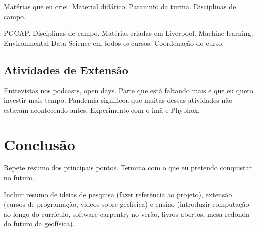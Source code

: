 \documentclass[10pt,a4paper,oneside]{book}
\begin{document}
Matérias que eu criei.
Material didático.
Paraninfo da turma.
Disciplinas de campo.

PGCAP.
Disciplinas de campo.
Matérias criadas em Liverpool.
Machine learning.
Environmental Data Science em todos os cursos.
Coordenação do curso.


\section{Atividades de Extensão}

Entrevistas nos podcasts, open days.
Parte que está faltando mais e que eu quero investir mais tempo.
Pandemia significou que muitas dessas atividades não estavam acontecendo antes.
Experimento com o imã e Phyphox.


\chapter{Conclusão}
\label{cap_conclusao}

Repete resumo dos principais pontos.
Termina com o que eu pretendo conquistar no futuro.

Incluir resumo de ideias de pesquisa (fazer referência ao projeto),
extensão (cursos de programação, videos sobre geofísica) e ensino (introduzir
computação ao longo do currículo, software carpentry no verão, livros abertos,
mesa redonda do futuro da geofísica).

\backmatter


\end{document}
